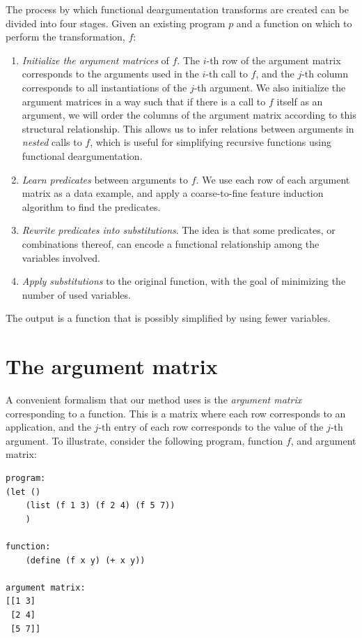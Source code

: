 \documentclass{acmsiggraph}
\begin{document}
The process by which functional deargumentation transforms are created can be divided into four stages.
Given an existing program $p$ and a function on which to perform the transformation, $f$:

\begin{enumerate}
\item \emph{Initialize the argument matrices} of $f$.
The $i$-th row of the argument matrix corresponds to the arguments used in the $i$-th call to $f$,
and the $j$-th column corresponds to all instantiations of the $j$-th argument.
We also initialize the argument matrices in a way such that
if there is a call to $f$ itself as an argument,
we will order the columns of the argument matrix
according to this structural relationship.
This allows us to infer relations between arguments in \emph{nested} calls to $f$,
which is useful for simplifying recursive functions using functional deargumentation.

\item \emph{Learn predicates} between arguments to $f$. We use each row of each argument matrix
as a data example, and apply a coarse-to-fine feature induction algorithm
to find the predicates.

\item \emph{Rewrite predicates into substitutions}. The idea is that some predicates,
or combinations thereof, can encode a functional relationship among the variables involved.

\item \emph{Apply substitutions} to the original function,
with the goal of minimizing the number of used variables.
\end{enumerate}

The output is a function that is possibly simplified by using fewer variables.

\section{The argument matrix}

A convenient formalism that our method uses is the
\emph{argument matrix} corresponding to a function.
This is a matrix where each row corresponds to an application,
and the $j$-th entry of each row corresponds to the value of the $j$-th argument.
To illustrate, consider the following program, function $f$, and argument matrix:

\begin{lstlisting}
program:
(let ()
    (list (f 1 3) (f 2 4) (f 5 7))
    )

function: 
    (define (f x y) (+ x y))

argument matrix: 
[[1 3]
 [2 4]
 [5 7]]
\end{lstlisting}
\end{document}
